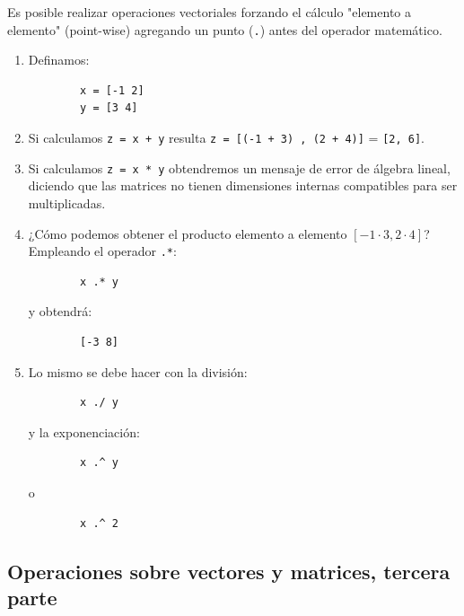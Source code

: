 \documentclass[11pt,a4paper,openany]{book}
\begin{document}
Es posible realizar operaciones vectoriales forzando el cálculo "elemento a elemento" (point-wise) agregando un punto (\texttt{.}) antes del operador matemático.
\begin{enumerate}
	\item Definamos:
	\begin{verbatim}
		x = [-1 2]
		y = [3 4]
	\end{verbatim}
	
	\item Si calculamos \texttt{z = x + y} resulta \texttt{z = [(-1 + 3) , (2 + 4)]} = \texttt{[2, 6]}.
	\item Si calculamos \texttt{z = x * y} obtendremos un mensaje de error de álgebra lineal, diciendo que las matrices no tienen dimensiones internas compatibles para ser multiplicadas.
	\item ¿Cómo podemos obtener el producto elemento a elemento $[-1 \cdot 3, 2 \cdot 4]$? Empleando el operador \texttt{.*}:
	\begin{verbatim}
		x .* y
	\end{verbatim}
	y obtendrá:
	\begin{verbatim}
		[-3 8]
	\end{verbatim}
	
	\item Lo mismo se debe hacer con la división:
	\begin{verbatim}
		x ./ y
	\end{verbatim}
	y la exponenciación:
	\begin{verbatim}
		x .^ y
	\end{verbatim}
	o
	\begin{verbatim}
		x .^ 2
	\end{verbatim}
\end{enumerate}

\subsection{Operaciones sobre vectores y matrices, tercera parte}
\end{document}
